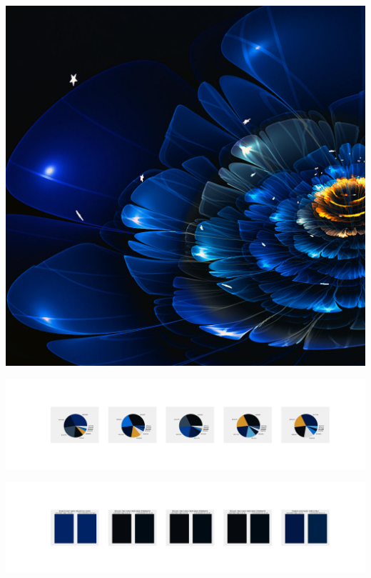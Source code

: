 \documentclass[11pt]{article}
\begin{document}
\begin{landscape}
    \begin{center}
    \includegraphics[width=\textwidth]{./nbimg/file (103).jpg}
    \end{center}

    \begin{center}
    \includegraphics[width=250mm]{./nbimg/pie-5.jpg}
    \end{center}

    \begin{center}
    \includegraphics[width=250mm]{./nbimg/peak-5.jpg}
    \end{center}
    


\end{landscape}
\end{document}
